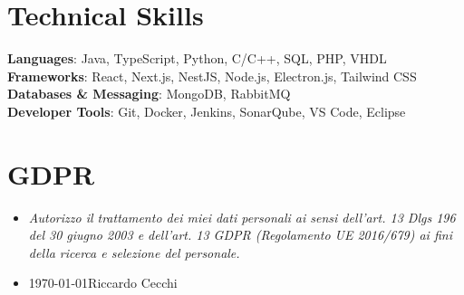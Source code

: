 \documentclass[letterpaper,11pt]{article}
\newcommand{\resumeSubHeadingListStart}{\begin{itemize}[leftmargin=0.15in, label={}]}
\newcommand{\resumeSubHeadingListEnd}{\end{itemize}}
\begin{document}
\section{Technical Skills}
 \begin{itemize}[leftmargin=0.15in, label={}]
    \small{\item{
     \textbf{Languages}: Java, TypeScript, Python, C/C++, SQL, PHP, VHDL \\
     \textbf{Frameworks}: React, Next.js, NestJS, Node.js, Electron.js, Tailwind CSS \\
     \textbf{Databases \& Messaging}: MongoDB, RabbitMQ \\
     \textbf{Developer Tools}: Git, Docker, Jenkins, SonarQube, VS Code, Eclipse
    }}
 \end{itemize}

\section{GDPR}
  \resumeSubHeadingListStart
    \item{\emph{Autorizzo il trattamento dei miei dati personali ai sensi dell'art. 13 Dlgs 196 del 30 giugno 2003 e dell'art. 13 GDPR (Regolamento UE 2016/679) ai fini della ricerca e selezione del personale.}}
    \item{\today \hfill Riccardo Cecchi}
  \resumeSubHeadingListEnd
\end{document}
